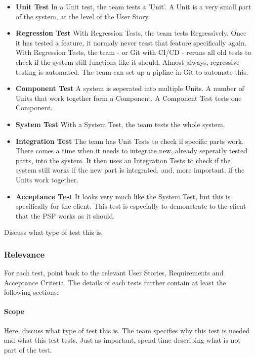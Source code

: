 \documentclass[10pt]{report}
\begin{document}
\begin{itemize}
	\item \textbf{Unit Test} In a Unit test, the team tests a 'Unit'. A Unit is a very small part of the system, at the level of the User Story.
	\item \textbf{Regression Test} With Regression Tests, the team tests Regressively. Once it has tested a feature, it normaly never tesst that feature specifically again. With Regression Tests, the team - or Git with CI/CD - reruns all old tests to check if the system still functions like it should. Almost always, regressive testing is automated. The team can set up a pipline in Git to automate this.
	\item \textbf{Component Test} A system is seperated into multiple Units. A number of Units that work together form a Component. A Component Test tests one Component.
	\item \textbf{System Test} With a System Test, the team tests the whole system.
	\item \textbf{Integration Test} The team has Unit Tests to check if specific parts work. There comes a time when it needs to integrate new, already seperatly tested parts, into the system. It then uses an Integration Tests to check if the system still works if the new part is integrated, and, more important, if the Units work together.
	\item \textbf{Acceptance Test} It looks very much like the System Test, but this is specifically for the client. This test is especially to demonstrate to the client that the PSP works as it should.
\end{itemize}

Discuss what type of test this is.

\subsubsection{Relevance}

For each test, point back to the relevant User Stories, Requirements and Acceptance Criteria. The details of each tests further contain at least the following sections:

\paragraph{Scope}

Here, discuss what type of test this is. The team specifies why this test is needed and what this test tests. Just as important, spend time describing what is not part of the test.
\end{document}
